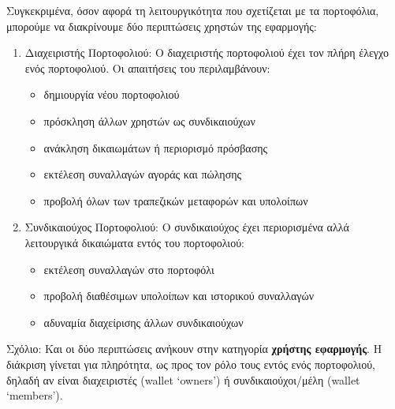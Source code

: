 Συγκεκριμένα, όσον αφορά τη λειτουργικότητα που σχετίζεται με τα πορτοφόλια, μπορούμε να διακρίνουμε δύο περιπτώσεις χρηστών της εφαρμογής:
\begin{enumerate}
    \item Διαχειριστής Πορτοφολιού:
        Ο διαχειριστής πορτοφολιού έχει τον πλήρη έλεγχο ενός πορτοφολιού. Οι απαιτήσεις
    του περιλαμβάνουν:
        \begin{itemize}
            \item δημιουργία νέου πορτοφολιού
            \item πρόσκληση άλλων χρηστών ως συνδικαιούχων
            \item ανάκληση δικαιωμάτων ή περιορισμό πρόσβασης
            \item εκτέλεση συναλλαγών αγοράς και πώλησης
            \item προβολή όλων των τραπεζικών μεταφορών και υπολοίπων
        \end{itemize}
    
    \item Συνδικαιούχος Πορτοφολιού:
        Ο συνδικαιούχος έχει περιορισμένα αλλά λειτουργικά δικαιώματα εντός του πορτοφολιού:
        \begin{itemize}
            \item εκτέλεση συναλλαγών στο πορτοφόλι
            \item προβολή διαθέσιμων υπολοίπων και ιστορικού συναλλαγών
            \item αδυναμία διαχείρισης άλλων συνδικαιούχων
        \end{itemize}
\end{enumerate}

Σχόλιο: Και οι δύο περιπτώσεις ανήκουν στην κατηγορία \textbf{χρήστης εφαρμογής}. 
Η διάκριση γίνεται για πληρότητα, ως προς τον ρόλο τους εντός ενός πορτοφολιού, δηλαδή αν είναι διαχειριστές (wallet `owners') ή συνδικαιούχοι/μέλη (wallet `members').




\newpage